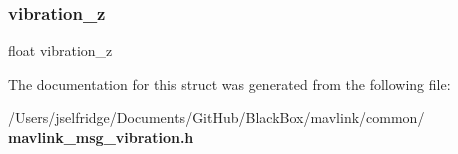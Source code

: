 \mbox{\label{struct____mavlink__vibration__t_afac8df8d15d1aad2ed839fe716a9693e}} 
\subsubsection{vibration\+\_\+z}
{\footnotesize\ttfamily float vibration\+\_\+z}



The documentation for this struct was generated from the following file\+:\begin{DoxyCompactItemize}
\item 
/\+Users/jselfridge/\+Documents/\+Git\+Hub/\+Black\+Box/mavlink/common/\textbf{ mavlink\+\_\+msg\+\_\+vibration.\+h}\end{DoxyCompactItemize}
